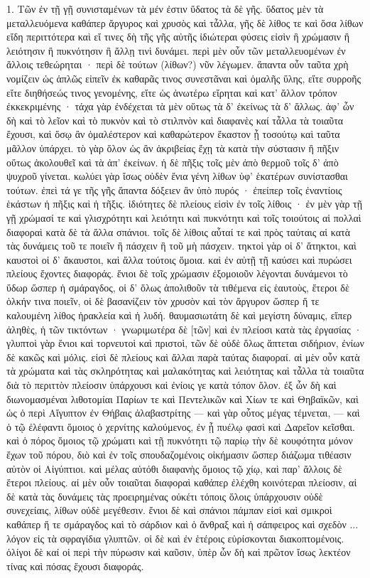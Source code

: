 \documentclass[a4paper, 11pt, oneside, polutonikogreek, german]{article}
\begin{document}
\setlength{\parskip}{1mm plus1mm minus1mm}
\clearpage
\large
1. Τῶν ἐν τῇ γῇ συνισταμένων τὰ μέν ἐστιν ὕδατος τὰ δὲ γῆς. ὕδατος μὲν τὰ μεταλλευόμενα καθάπερ ἄργυρος καὶ χρυσὸς καὶ τἆλλα, γῆς δὲ λίθος τε καὶ ὅσα λίθων εἴδη περιττότερα καὶ εἴ τινες δὴ τῆς γῆς αὐτῆς ἰδιώτεραι φύσεις εἰσὶν ἢ χρώμασιν ἢ λειότησιν ἢ πυκνότησιν ἢ ἄλλῃ τινὶ δυνάμει. περὶ μὲν οὖν τῶν μεταλλευομένων ἐν ἄλλοις τεθεώρηται · περὶ δὲ τούτων (λίθων?) νῦν λέγωμεν. ἅπαντα οὖν ταῦτα χρὴ νομίζειν ὡς ἁπλῶς εἰπεῖν ἐκ καθαρᾶς τινος συνεστᾶναι καὶ ὁμαλῆς ὕλης, εἴτε συρροῆς εἴτε διηθήσεώς τινος γενομένης, εἴτε ὡς ἀνωτέρω εἴρηται καὶ κατ' ἄλλον τρόπον ἐκκεκριμένης · τάχα γὰρ ἐνδέχεται τὰ μὲν οὕτως τὰ δ' ἐκείνως τὰ δ' ἄλλως. ἀφ' ὧν δὴ καὶ τὸ λεῖον καὶ τὸ πυκνὸν καὶ τὸ στιλπνὸν καὶ διαφανὲς καί τἆλλα τὰ τοιαῦτα ἔχουσι, καὶ ὅσῳ ἂν ὁμαλέστερον καὶ καθαρώτερον ἕκαστον ᾖ τοσούτῳ καὶ ταῦτα μᾶλλον ὑπάρχει. τὸ γὰρ ὅλον ὡς ἂν ἀκριβείας ἔχῃ τὰ κατὰ τὴν σύστασιν ἢ πῆξιν οὕτως ἀκολουθεῖ καὶ τὰ ἀπ' ἐκείνων. ἡ δὲ πῆξις τοῖς μὲν ἀπὸ θερμοῦ τοῖς δ' ἀπὸ ψυχροῦ γίνεται. κωλύει γὰρ ἴσως οὐδὲν ἔνια γένη λίθων ὑφ' ἑκατέρων συνίστασθαι τούτων. ἐπεὶ τά γε τῆς γῆς ἅπαντα δόξειεν ἂν ὑπὸ πυρός · ἐπείπερ τοῖς ἐναντίοις ἑκάστων ἡ πῆξις καὶ ἡ τῆξις. ἰδιότητες δὲ πλείους εἰσὶν ἐν τοῖς λίθοις · ἐν μὲν γὰρ τῇ γῇ χρώμασί τε καὶ γλισχρότητι καὶ λειότητι καὶ πυκνότητι καὶ τοῖς τοιούτοις αἱ πολλαὶ διαφοραὶ κατὰ δὲ τὰ ἄλλα σπάνιοι. τοῖς δὲ λίθοις αὗταί τε καὶ πρὸς ταύταις αἱ κατὰ τὰς δυνάμεις τοῦ τε ποιεῖν ἢ πάσχειν ἢ τοῦ μὴ πάσχειν. τηκτοὶ γὰρ οἱ δ' ἄτηκτοι, καὶ καυστοὶ οἱ δ' ἄκαυστοι, καὶ ἄλλα τούτοις ὅμοια. καὶ ἐν αὐτῇ τῇ καύσει καὶ πυρώσει πλείους ἔχοντες διαφοράς. ἔνιοι δὲ τοῖς χρώμασιν ἐξομοιοῦν λέγονται δυνάμενοι τὸ ὕδωρ ὥσπερ ἡ σμάραγδος, οἱ δ' ὅλως ἀπολιθοῦν τὰ τιθέμενα εἰς ἑαυτοὺς, ἕτεροι δὲ ὁλκήν τινα ποιεῖν, οἱ δὲ βασανίζειν τὸν χρυσὸν καὶ τὸν ἄργυρον ὥσπερ ἥ τε καλουμένη λίθος ἡρακλεία καὶ ἡ λυδή. θαυμασιωτάτη δὲ καὶ μεγίστη δύναμις, εἴπερ ἀληθὲς, ἡ τῶν τικτόντων · γνωριμωτέρα δὲ [τῶν] καὶ ἐν πλείοσι κατὰ τὰς ἐργασίας · γλυπτοὶ γὰρ ἔνιοι καὶ τορνευτοὶ καὶ πριστοὶ, τῶν δὲ οὐδὲ ὅλως ἅπτεται σιδήριον, ἐνίων δὲ κακῶς καὶ μόλις. εἰσὶ δὲ πλείους καὶ ἄλλαι παρὰ ταύτας διαφοραί. αἱ μὲν οὖν κατὰ τὰ χρώματα καὶ τὰς σκληρότητας καὶ μαλακότητας καὶ λειότητας καὶ τἆλλα τὰ τοιαῦτα διὰ τὸ περιττὸν πλείοσιν ὑπάρχουσι καὶ ἐνίοις γε κατὰ τόπον ὅλον. ἐξ ὧν δὴ καὶ διωνομασμέναι λιθοτομίαι Παρίων τε καὶ Πεντελικῶν καὶ Χίων τε καὶ Θηβαϊκῶν, καὶ ὡς ὁ περὶ Αἴγυπτον ἐν Θήβαις ἀλαβαστρίτης --- καὶ γὰρ οὗτος μέγας τέμνεται, --- καὶ ὁ τῷ ἐλέφαντι ὅμοιος ὁ χερνίτης καλούμενος, ἐν ᾗ πυέλῳ φασὶ καὶ Δαρεῖον κεῖσθαι. καὶ ὁ πόρος ὅμοιος τῷ χρώματι καὶ τῇ πυκνότητι τῷ παρίῳ τὴν δὲ κουφότητα μόνον ἔχων τοῦ πόρου, διὸ καὶ ἐν τοῖς σπουδαζομένοις οἰκήμασιν ὥσπερ διάζωμα τιθέασιν αὐτὸν οἱ Αἰγύπτιοι. καὶ μέλας αὐτόθι διαφανὴς ὅμοιος τῷ χίῳ, καὶ παρ' ἄλλοις δὲ ἕτεροι πλείους. αἱ μὲν οὖν τοιαῦται διαφοραὶ καθάπερ ἐλέχθη κοινότεραι πλείοσιν, αἱ δὲ κατὰ τὰς δυνάμεις τὰς προειρημένας οὐκέτι τόποις ὅλοις ὑπάρχουσιν οὐδὲ συνεχείαις, λίθων οὐδὲ μεγέθεσιν. ἔνιοι δὲ καὶ σπάνιοι πάμπαν εἰσὶ καὶ σμικροὶ καθάπερ ἥ τε σμάραγδος καὶ τὸ σάρδιον καὶ ὁ ἄνθραξ καὶ ἡ σάπφειρος καὶ σχεδὸν ... λόγον εἰς τὰ σφραγίδια γλυπτῶν. οἱ δὲ καὶ ἐν ἑτέροις εὑρίσκονται διακοπτομένοις. ὀλίγοι δὲ καί οἱ περὶ τὴν πύρωσιν καὶ καῦσιν, ὑπὲρ ὧν δὴ καὶ πρῶτον ἴσως λεκτέον τίνας καὶ πόσας ἔχουσι διαφοράς.
\end{document}

